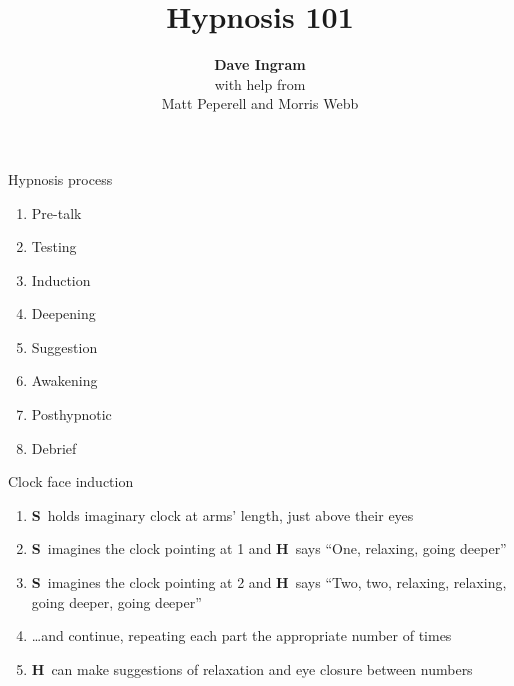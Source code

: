\documentclass[style=mindhack]{powerdot}
\title{Hypnosis 101}
\author{\textbf{Dave Ingram}\vspace*{3pt}\\\footnotesize with help from\vspace*{3pt}\\\small Matt Peperell and Morris Webb}
\newcommand\hypS{\textcolor{blue!40!black}{\textbf{S}}}
\newcommand\hypH{\textcolor{green!60!black}{\textbf{H}}}
\newcommand\hl[2]{{\onslide*{#1}{\bfseries\color{red}}#2}}
\begin{document}
	\maketitle

  \begin{slide}{Hypnosis process}%
    \begin{center}
      \begin{minipage}{.35\linewidth}
        \Large
        \begin{enumerate}
          \item Pre-talk
          \item Testing
          \item \hl{2}{Induction}
          \item \hl{2}{Deepening}
          \item \hl{2}{Suggestion}
          \item \hl{2}{Awakening}
          \item \hl{2}{Posthypnotic}
          \item Debrief
        \end{enumerate}
      \end{minipage}
    \end{center}
  \end{slide}

  \begin{slide}{Clock face induction}%
    \begin{enumerate}
      \item \hypS\ holds imaginary clock at arms' length, just above their eyes
      \item \hypS\ imagines the clock pointing at 1 and \hypH\ says ``One, relaxing, going deeper''
      \item \hypS\ imagines the clock pointing at 2 and \hypH\ says ``Two, two, relaxing, relaxing, going deeper, going deeper''
      \item \ldots and continue, repeating each part the appropriate number of times
      \item \hypH\ can make suggestions of relaxation and eye closure between numbers
    \end{enumerate}
  \end{slide}
\end{document}
